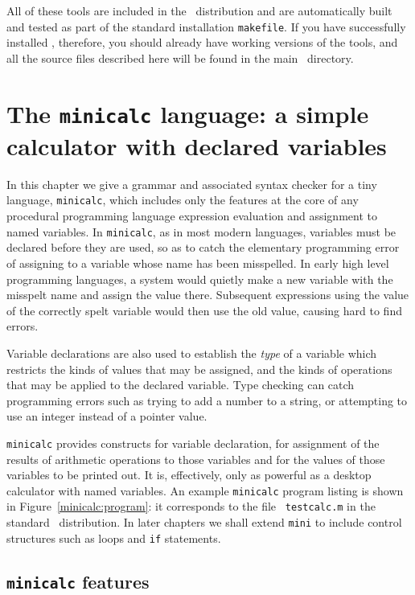 All of these tools are included in the \rdp\ distribution and 
are automatically built and
tested as part of the standard installation {\tt makefile}. If you have
successfully installed \rdp, therefore, you should already have working
versions of the tools, and all the source files described here will be
found in the main \rdp\ directory.

\chapter{The {\tt minicalc} language: a simple calculator with declared variables}
\label{minicalc}
In this chapter we give a grammar and associated syntax checker
for a tiny language, {\tt minicalc}, which includes only the features at the
core of any procedural programming language \dash expression
evaluation and assignment to named variables. In {\tt minicalc}, as in
most modern languages,
variables must be declared before they are used, so as to catch the
elementary programming error of assigning to a variable whose name has
been misspelled. In early high level programming languages, a system
would quietly make a new variable with the misspelt name and assign the
value there. Subsequent expressions using the value of the correctly
spelt variable would then use the old value, causing hard to find errors. 

Variable declarations are also used to establish the {\em type} of a
variable which restricts the kinds of values that may be assigned, and
the kinds of operations that  may be applied to the declared variable. Type checking can
catch programming errors such as trying to add a number to a string, or
attempting to use an integer instead of a pointer value.

{\tt minicalc} provides constructs for variable
declaration, for assignment of the results of arithmetic operations to
those variables and for the values of those variables to be printed out.
It is, effectively, only as powerful as a desktop calculator with named
variables. An example {\tt minicalc} program listing is shown in
Figure~\ref{minicalc:program}: it corresponds to the file {\tt
testcalc.m} in the standard \rdp\ distribution. In later chapters we
shall extend {\tt mini} to include control structures such as loops and
{\tt if} statements.

\section{{\tt minicalc} features}

